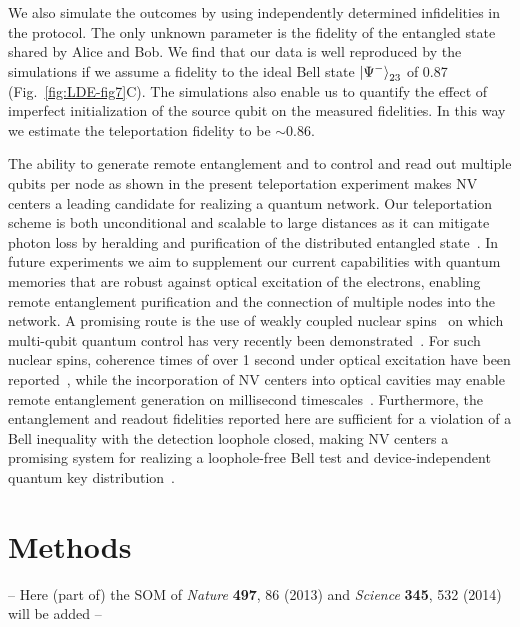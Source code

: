 We also simulate the outcomes by using independently determined infidelities in the protocol. The only unknown parameter is the fidelity of the entangled state shared by Alice and Bob. We find that our data is well reproduced by the simulations if we assume a fidelity to the ideal Bell state $\left|\Psi^-\right>_{23}$ of 0.87 (Fig.~\ref{fig:LDE-fig7}C). The simulations also enable us to quantify the effect of imperfect initialization of the source qubit on the measured fidelities. In this way we estimate the teleportation fidelity to be $\sim 0.86$.

The ability to generate remote entanglement and to control and read out multiple qubits per node as shown in the present teleportation experiment makes NV centers a leading candidate for realizing a quantum network. Our teleportation scheme is both unconditional and scalable to large distances as it can mitigate photon loss by heralding and purification of the distributed entangled state~\cite{Briegel_Phys.Rev.Lett._1998}. In future experiments we aim to supplement our current capabilities with quantum memories that are robust against optical excitation of the electrons, enabling remote entanglement purification and the connection of multiple nodes into the network. A promising route is the use of weakly coupled nuclear spins~\cite{Taminiau_Phys.Rev.Lett._2012,Kolkowitz_Phys.Rev.Lett._2012,Zhao_NatNano_2012} on which multi-qubit quantum control has very recently been demonstrated~\cite{Taminiau_NatNano_2014}. For such nuclear spins, coherence times of over 1 second under optical excitation have been reported~\cite{Maurer_Science_2012}, while the incorporation of NV centers into optical cavities may enable remote entanglement generation on millisecond timescales~\cite{Loncar_MRS_2013}. Furthermore, the entanglement and readout fidelities reported here are sufficient for a violation of a Bell inequality with the detection loophole closed, making NV centers a promising system for realizing a loophole-free Bell test and device-independent quantum key distribution~\cite{Brunner_Rev.Mod.Phys._2014}. 

\section{Methods}

-- Here (part of) the SOM of {\em Nature} \textbf{497}, 86 (2013) and {\em Science} \textbf{345}, 532 (2014) will be added --
\clearpage



